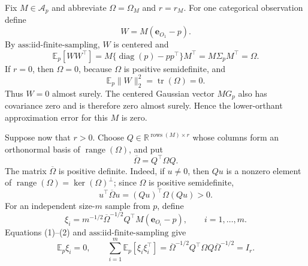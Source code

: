 Fix \(M\in\mathcal A_p\) and abbreviate \(\Omega=\Omega_M\) and \(r=r_M\).  For one categorical observation define
\[
W=M(\mathbf e_{O_1}-p).
\]
By \(\text{ass:iid-finite-sampling}\), \(W\) is centered and
\[
\mathbb E_p[WW^{\top}]
=M\{\operatorname{diag}(p)-pp^{\top}\}M^{\top}
=M\Sigma_pM^{\top}
=\Omega.
\tag{1}
\]
If \(r=0\), then \(\Omega=0\), because \(\Omega\) is positive semidefinite, and
\[
\mathbb E_p\|W\|_2^2=\operatorname{tr}(\Omega)=0.
\]
Thus \(W=0\) almost surely.  The centered Gaussian vector \(MG_p\) also has covariance zero and is therefore zero almost surely.  Hence the lower-orthant approximation error for this \(M\) is zero.

Suppose now that \(r>0\).  Choose \(Q\in\mathbb R^{\operatorname{rows}(M)\times r}\) whose columns form an orthonormal basis of \(\operatorname{range}(\Omega)\), and put
\[
\overline\Omega=Q^{\top}\Omega Q.
\]
The matrix \(\overline\Omega\) is positive definite.  Indeed, if \(u\ne0\), then \(Qu\) is a nonzero element of \(\operatorname{range}(\Omega)=\ker(\Omega)^{\perp}\); since \(\Omega\) is positive semidefinite,
\[
u^{\top}\overline\Omega u=(Qu)^{\top}\Omega(Qu)>0.
\tag{2}
\]
For an independent size-\(m\) sample from \(p\), define
\[
\xi_i=m^{-1/2}\overline\Omega^{-1/2}Q^{\top}M(\mathbf e_{O_i}-p),
\qquad i=1,\ldots,m.
\]
Equations (1)--(2) and \(\text{ass:iid-finite-sampling}\) give
\[
\mathbb E_p\xi_i=0,
\qquad
\sum_{i=1}^m\mathbb E_p[\xi_i\xi_i^{\top}]
=\overline\Omega^{-1/2}Q^{\top}\Omega Q\overline\Omega^{-1/2}
=I_r.
\tag{3}
\]

